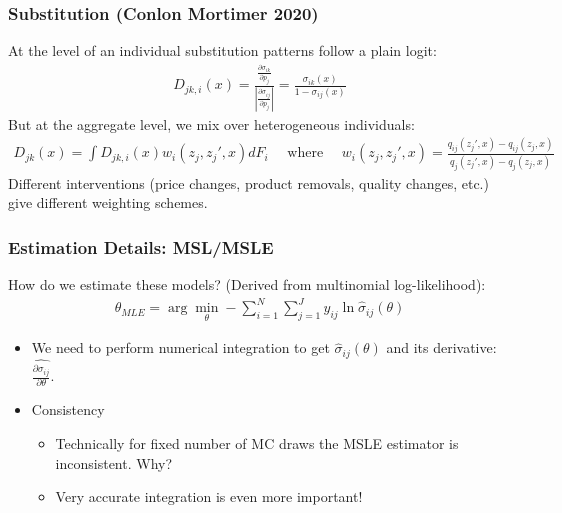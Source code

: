 \documentclass[aspectratio=169,11pt]{beamer}
\begin{document}
\begin{frame}
\frametitle{Substitution (Conlon Mortimer 2020)}
At the level of an individual substitution patterns follow a plain logit:
\begin{align*}
D_{jk,i}(x) = \frac{\frac{\partial \sigma_{ik}}{\partial p_j}}{\left| \frac{\partial \sigma_{ij}}{\partial p_j} \right|} = \frac{\sigma_{ik}(x)}{1-\sigma_{ij}(x)}
\end{align*}
But at the aggregate level, we mix over heterogeneous individuals:
\begin{align*}
D_{jk}(x) = \int D_{jk,i}(x) w_i(z_j,z_j',x) d F_i \quad  \text{ where }
\quad w_i(z_j,z_j',x) = \frac{q_{ij}(z_j',x)-q_{ij}(z_j,x)}{q_{j}(z_j',x)-q_{j}(z_j,x)}
\end{align*}
Different interventions (price changes, product removals, quality changes, etc.) give different weighting schemes.
\end{frame}


\begin{frame}
\frametitle{Estimation Details: MSL/MSLE}
How do we estimate these models? (Derived from multinomial log-likelihood):
\begin{align*}
\theta_{MLE} = \arg \min_{\theta} - \sum_{i=1}^N \sum_{j=1}^J y_{ij} \ln \widehat{\sigma}_{ij}(\theta)
\end{align*}

\begin{itemize}
\item We need to perform numerical integration to get $\widehat{\sigma}_{ij}(\theta)$ and its derivative: $\widehat{\frac{\partial \sigma_{ij}}{\partial \theta}}$.
\item Consistency
\begin{itemize}
\item Technically for fixed number of MC draws the MSLE estimator is inconsistent. Why?
\item Very accurate integration is even more important!
\end{itemize}
\end{itemize}

\end{frame}
\end{document}
